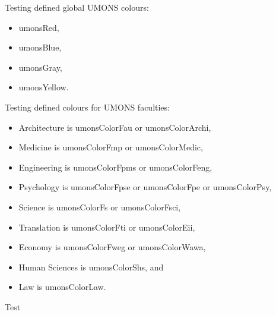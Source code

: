 \documentclass{standalone}
\begin{document}
Testing defined global UMONS colours: 
\begin{itemize}
	\item \textcolor{umonsRed}{umonsRed},
	\item \textcolor{umonsBlue}{umonsBlue},
	\item \textcolor{umonsGray}{umonsGray},
	\item \textcolor{umonsYellow}{umonsYellow}.
\end{itemize}

Testing defined colours for UMONS faculties: 
\begin{itemize}
	\item Architecture is \textcolor{umonsColorFau}{umonsColorFau} or \textcolor{umonsColorArchi}{umonsColorArchi},
	\item Medicine is \textcolor{umonsColorFmp}{umonsColorFmp} or \textcolor{umonsColorMedic}{umonsColorMedic},
	\item Engineering is \textcolor{umonsColorFpms}{umonsColorFpms} or \textcolor{umonsColorFeng}{umonsColorFeng},
	\item Psychology is \textcolor{umonsColorFpse}{umonsColorFpse} or \textcolor{umonsColorFpe}{umonsColorFpe} or \textcolor{umonsColorPsy}{umonsColorPsy},
	\item Science is \textcolor{umonsColorFs}{umonsColorFs} or \textcolor{umonsColorFsci}{umonsColorFsci},
	\item Translation is \textcolor{umonsColorFti}{umonsColorFti} or \textcolor{umonsColorEii}{umonsColorEii},
	\item Economy is \textcolor{umonsColorFweg}{umonsColorFweg} or \textcolor{umonsColorWawa}{umonsColorWawa},
	\item Human Sciences is \textcolor{umonsColorShs}{umonsColorShs}, and
	\item Law is \textcolor{umonsColorLaw}{umonsColorLaw}.
\end{itemize}

\begin{table}
	\centering
	\caption{Test}
\end{table}

\begin{testcolors}
\end{testcolors}

\end{document}
